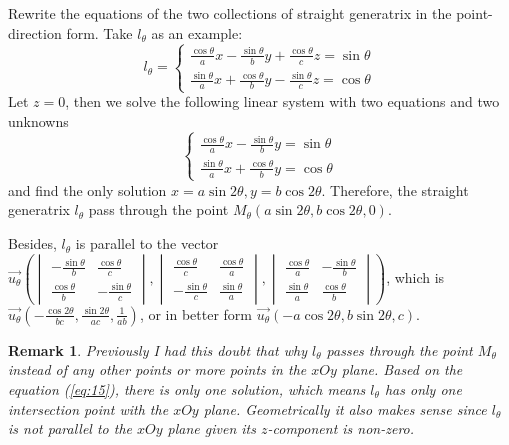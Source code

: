 \documentclass[onecolumn]{ctexart}
\newtheorem{remark}{Remark}
\begin{document}
Rewrite the equations of the two collections of straight generatrix in the
point-direction form. Take $l_{\theta}$ as an example:
\[
  l_{\theta} =
  \begin{cases}
    \frac{\cos\theta}{a} x - \frac{\sin\theta}{b} y + \frac{\cos\theta}{c} z = \sin\theta \\
    \frac{\sin\theta}{a} x + \frac{\cos\theta}{b} y - \frac{\sin\theta}{c} z = \cos\theta
  \end{cases} 
\]
Let $z = 0$, then we solve the following linear system with two equations and two 
unknowns
\begin{equation} \label{eq:15}
  \begin{cases}
    \frac{\cos\theta}{a} x - \frac{\sin\theta}{b} y = \sin\theta \\
    \frac{\sin\theta}{a} x + \frac{\cos\theta}{b} y = \cos\theta
  \end{cases}  
\end{equation}
and find the only solution $x = a\sin2\theta, y = b\cos2\theta$. Therefore, the 
straight generatrix $l_{\theta}$ pass through the point 
$M_{\theta}(a\sin2\theta, b\cos2\theta, 0)$.

Besides, $l_{\theta}$ is parallel to the vector $\vec{u_{\theta}}(
\begin{vmatrix}
  -\frac{\sin\theta}{b} & \frac{\cos\theta}{c} \\
  \frac{\cos\theta}{b} & -\frac{\sin\theta}{c}
\end{vmatrix},
\begin{vmatrix}
  \frac{\cos\theta}{c} & \frac{\cos\theta}{a} \\
  -\frac{\sin\theta}{c} & \frac{\sin\theta}{a}
\end{vmatrix},
\begin{vmatrix}
  \frac{\cos\theta}{a} & -\frac{\sin\theta}{b} \\
  \frac{\sin\theta}{a} & \frac{\cos\theta}{b}
\end{vmatrix}
)$, which is \\ $\vec{u_{\theta}}(-\frac{\cos2\theta}{bc}, 
\frac{\sin2\theta}{ac}, \frac{1}{ab})$, or in better form $\vec{u_{\theta}}
(-a\cos2\theta, b\sin2\theta, c)$.

\begin{remark}
  Previously I had this doubt that why $l_\theta$ passes through the point 
  $M_\theta$ instead of any other points or more points in the $xOy$ plane. 
  Based on the equation (\ref{eq:15}), there is only one solution, which means 
  $l_\theta$ has only one intersection point with the $xOy$ plane. Geometrically 
  it also makes sense since $l_\theta$ is not parallel to the $xOy$ plane given 
  its $z$-component is non-zero.
\end{remark}
\end{document}
